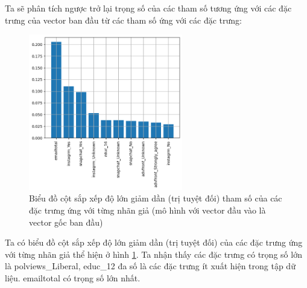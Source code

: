 \begin{enumerate}[label=(\alph*)]
    Ta sẽ phân tích ngược trở lại trọng số của các tham số tương ứng với các đặc trưng của vector ban đầu từ các tham số ứng với các đặc trưng:

    \begin{figure}[H]
        \centering
        \includegraphics[width=0.6\textwidth]{figures/Thanh/Models/Random_Forest/Non_null_models_Feature_Importance_Random_Forest_original_features.png}
        \caption{Biểu đồ cột sắp xếp độ lớn giảm dần (trị tuyệt đối) tham số của các đặc trưng ứng với từng nhãn giả (mô hình với vector đầu vào là vector gốc ban đầu)}
        \label{fig:Non_null_models_Feature_Importance_Random_Forest_original_features}
    \end{figure}

    Ta có biểu đồ cột sắp xếp độ lớn giảm dần (trị tuyệt đối) của các đặc trưng ứng với từng nhãn giả thể hiện ở hình \ref{fig:Non_null_models_Feature_Importance_Random_Forest_original_features}.
    Ta nhận thấy các đặc trưng có trọng số lớn là polviews\_Liberal, educ\_12 đa số là các đặc trưng ít xuất hiện trong tập dữ liệu.
    emailtotal có trọng số lớn nhất.
\end{enumerate}